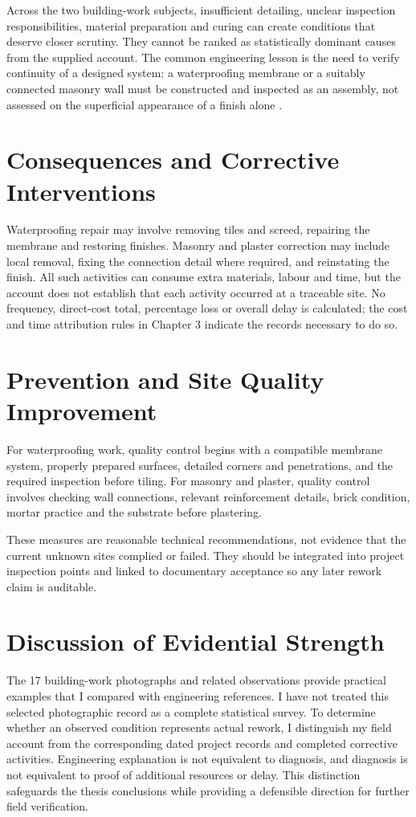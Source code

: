 Across the two building-work subjects, insufficient detailing, unclear inspection responsibilities, material preparation and curing can create conditions that deserve closer scrutiny. They cannot be ranked as statistically dominant causes from the supplied account. The common engineering lesson is the need to verify continuity of a designed system: a waterproofing membrane or a suitably connected masonry wall must be constructed and inspected as an assembly, not assessed on the superficial appearance of a finish alone \parencite{love2022,safapour2019}.

\section{Consequences and Corrective Interventions}
Waterproofing repair may involve removing tiles and screed, repairing the membrane and restoring finishes. Masonry and plaster correction may include local removal, fixing the connection detail where required, and reinstating the finish. All such activities can consume extra materials, labour and time, but the account does not establish that each activity occurred at a traceable site. No frequency, direct-cost total, percentage loss or overall delay is calculated; the cost and time attribution rules in Chapter 3 indicate the records necessary to do so.

\section{Prevention and Site Quality Improvement}
For waterproofing work, quality control begins with a compatible membrane system, properly prepared surfaces, detailed corners and penetrations, and the required inspection before tiling. For masonry and plaster, quality control involves checking wall connections, relevant reinforcement details, brick condition, mortar practice and the substrate before plastering.

These measures are reasonable technical recommendations, not evidence that the current unknown sites complied or failed. They should be integrated into project inspection points and linked to documentary acceptance so any later rework claim is auditable.

\section{Discussion of Evidential Strength}
The 17 building-work photographs and related observations provide practical examples that I compared with engineering references. I have not treated this selected photographic record as a complete statistical survey. To determine whether an observed condition represents actual rework, I distinguish my field account from the corresponding dated project records and completed corrective activities. Engineering explanation is not equivalent to diagnosis, and diagnosis is not equivalent to proof of additional resources or delay. This distinction safeguards the thesis conclusions while providing a defensible direction for further field verification.
